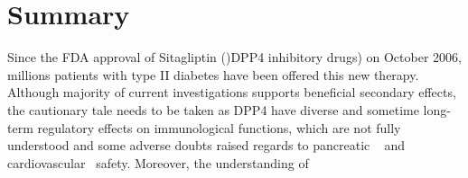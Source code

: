 \section{\label{chap:Sum} Summary}
Since the FDA approval of Sitagliptin ()DPP4 inhibitory drugs) on October 2006, millions patients with type II diabetes have been offered this new therapy. Although majority of current investigations supports beneficial secondary effects, the cautionary tale needs to be taken as DPP4 have diverse and sometime long-term regulatory effects on immunological functions, which are not fully understood and some adverse doubts raised regards to pancreatic ~\cite{Egan2014, Jermendy2016} and cardiovascular~\cite{Scirica2013} safety. Moreover, the understanding of 
